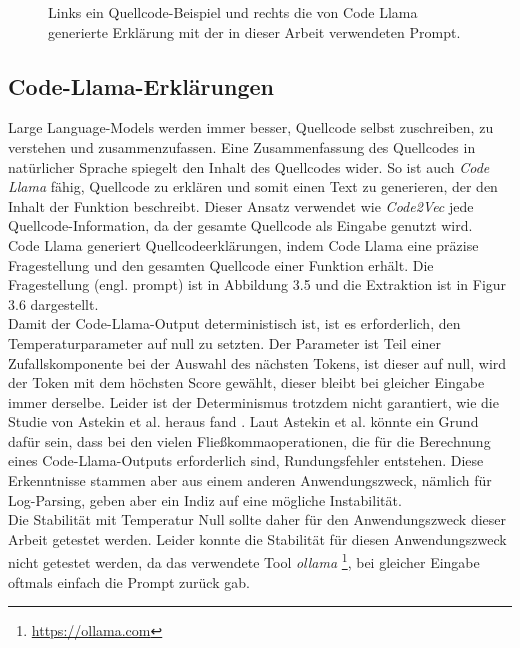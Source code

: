 \documentclass[12pt,letterpaper,ngerman]{article}
\begin{document}
\begin{figure}
  \begin{center}
    \begin{minipage}[c]{6cm}
        \centering
        \inputminted[fontsize=\scriptsize]{c}{summary.c}
    \end{minipage}
    \hspace{0.1cm}
    \begin{minipage}[c]{6cm}
        \centering
        \inputminted[fontsize=\scriptsize,breaklines]{json}{summary.json}
    \end{minipage}
  \end{center}
  \caption{
  Links ein Quellcode-Beispiel und rechts die von 
  Code Llama generierte Erklärung mit der in dieser 
  Arbeit verwendeten Prompt.
}
\end{figure}
\subsection{Code-Llama-Erklärungen}
Large Language-Models werden immer besser, Quellcode selbst
zuschreiben, zu verstehen und zusammenzufassen. Eine Zusammenfassung des Quellcodes
in natürlicher Sprache spiegelt den Inhalt des Quellcodes wider.
So ist auch \textit{Code Llama} fähig, Quellcode zu erklären und
somit einen Text zu generieren, der den Inhalt der Funktion 
beschreibt. Dieser Ansatz verwendet wie \textit{Code2Vec} 
jede Quellcode-Information, da der 
gesamte Quellcode als Eingabe genutzt wird.\\
Code Llama generiert Quellcodeerklärungen, indem Code Llama eine
präzise  Fragestellung und den gesamten Quellcode einer 
Funktion erhält.
Die Fragestellung (engl. prompt) ist in Abbildung 3.5
und die Extraktion ist in Figur 3.6 dargestellt.\\
Damit der Code-Llama-Output deterministisch ist,
ist es erforderlich, den Temperaturparameter auf null zu setzten. 
Der Parameter ist Teil einer Zufallskomponente bei der
Auswahl des nächsten Tokens, ist dieser auf null,
wird der Token mit dem höchsten Score gewählt, dieser 
bleibt bei gleicher Eingabe immer derselbe. Leider ist der
Determinismus trotzdem nicht garantiert, 
wie die Studie von Astekin et al. heraus fand
\cite{llmstable}. Laut Astekin et al. könnte ein Grund dafür sein,
dass bei den vielen Fließkommaoperationen, die für die Berechnung
eines Code-Llama-Outputs erforderlich sind,
Rundungsfehler entstehen. Diese Erkenntnisse stammen aber 
aus einem anderen Anwendungszweck, nämlich für Log-Parsing, 
geben aber ein Indiz auf eine mögliche Instabilität.\\
Die Stabilität mit Temperatur Null sollte daher für den
Anwendungszweck dieser Arbeit getestet werden. Leider 
konnte die Stabilität für diesen Anwendungszweck nicht 
getestet werden, da das verwendete Tool \textit{ollama}
\footnote{\url{https://ollama.com}}, bei gleicher
Eingabe oftmals einfach die Prompt zurück gab.
\end{document}
